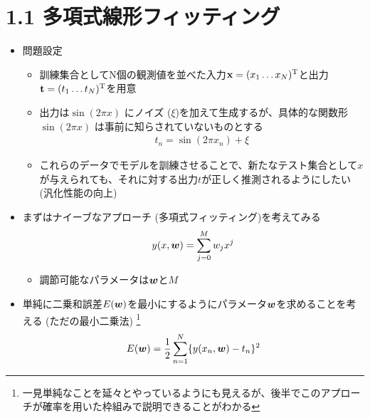 \documentclass[a4j,11pt]{jarticle}
\def\v#1{\mbox{\boldmath $#1$}}
\begin{document}
\section*{1.1 多項式線形フィッティング}
\begin{itemize}
	\item 問題設定
		\begin{itemize}
			\item 訓練集合としてN個の観測値を並べた入力$\v{\mathrm{x}} = (x_1 \ldots x_N)^{\mathrm{T}}$と出力$\v{\mathrm{t}} = (t_1 \ldots t_N)^{\mathrm{T}}$を用意
			\item 出力は$\sin(2\pi x)$ にノイズ ($\xi$)を加えて生成するが、具体的な関数形$\sin(2\pi x)$ は事前に知らされていないものとする
				\begin{align}
					t_n = \sin(2\pi x_n) + \xi
				\end{align}
			\item これらのデータでモデルを訓練させることで、新たなテスト集合として$x$が与えられても、それに対する出力$t$が正しく推測されるようにしたい (汎化性能の向上)
		\end{itemize}
	\item まずはナイーブなアプローチ (多項式フィッティング)を考えてみる
		\begin{align}
			y(x, \v{w}) = \sum_{j=0}^{M}w_jx^{j}
		\end{align}
		\begin{itemize}
			\item 調節可能なパラメータは$\v{w}$と$M$
		\end{itemize}
	\item 単純に二乗和誤差$E(\v{w})$を最小にするようにパラメータ$\v{w}$を求めることを考える (ただの最小二乗法)
		\footnote{一見単純なことを延々とやっているようにも見えるが、後半でこのアプローチが確率を用いた枠組みで説明できることがわかる}
		\begin{align}
			E(\v{w}) = \frac{1}{2}\sum_{n=1}^{N}\{y(x_n, \v{w})-t_n\}^2 
		\end{align}
\end{itemize}
\end{document}
